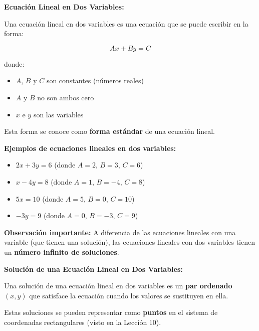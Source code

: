 


\begin{definition}
\textbf{Ecuación Lineal en Dos Variables:}

Una ecuación lineal en dos variables es una ecuación que se puede escribir en la forma:

$$\boxed{Ax + By = C}$$

donde:
\begin{itemize}
    \item $A$, $B$ y $C$ son constantes (números reales)
    \item $A$ y $B$ no son ambos cero
    \item $x$ e $y$ son las variables
\end{itemize}

Esta forma se conoce como \textbf{forma estándar} de una ecuación lineal.
\end{definition}

\textbf{Ejemplos de ecuaciones lineales en dos variables:}
\begin{itemize}
    \item $2x + 3y = 6$ \quad (donde $A = 2$, $B = 3$, $C = 6$)
    \item $x - 4y = 8$ \quad (donde $A = 1$, $B = -4$, $C = 8$)
    \item $5x = 10$ \quad (donde $A = 5$, $B = 0$, $C = 10$)
    \item $-3y = 9$ \quad (donde $A = 0$, $B = -3$, $C = 9$)
\end{itemize}

\textbf{Observación importante:} A diferencia de las ecuaciones lineales con una variable (que tienen una solución), las ecuaciones lineales con dos variables tienen un \textbf{número infinito de soluciones}.


\begin{definition}
\textbf{Solución de una Ecuación Lineal en Dos Variables:}

Una solución de una ecuación lineal en dos variables es un \textbf{par ordenado} $(x, y)$ que satisface la ecuación cuando los valores se sustituyen en ella.

Estas soluciones se pueden representar como \textbf{puntos} en el sistema de coordenadas rectangulares (visto en la Lección 10).
\end{definition}

